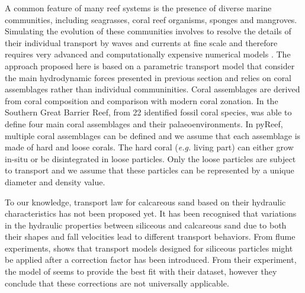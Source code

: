 \documentclass[default,jgrga]{agutex2015}
\begin{document}
\begin{article}
A common feature of many reef systems is the presence of diverse marine communities, including seagrasses, coral reef organisms, sponges and mangroves. Simulating the evolution of these communities involves to resolve the details of their individual transport by waves and currents at fine scale and therefore requires very advanced and computationally expensive numerical models \citep{Lowe16}. The approach proposed here is based on a parametric transport model that consider the main hydrodynamic forces presented in previous section and  relies on coral assemblages rather than individual communinities. Coral assemblages are derived from coral composition and comparison with modern coral zonation. In the Southern Great Barrier Reef, from 22 identified fossil coral species, \citet{Dechnik15} was able to define four main coral assemblages and their palaeoenvironments. In pyReef, multiple coral assemblages can be defined and we assume that each assemblage is made of hard and loose corals. The hard coral (\textit{e.g.} living part) can either grow in-situ or be disintegrated in loose particles. Only the loose particles are subject to transport and we assume that these particles can be represented by a unique diameter and density value.

To our knowledge, transport law for calcareous sand based on their hydraulic characteristics has not been proposed yet. It has been recognised \citep{Prager96, Day97, Smith04} that variations in the hydraulic properties between siliceous and calcareous sand due to both their shapes and fall velocities lead to different transport behaviors. From flume experiments, \citet{Smith05} shows that transport models designed for siliceous particles might be applied after a correction factor has been introduced. From their experiment, the model of \citet{Engelund67} seems to provide the best fit with their dataset, however they conclude that these corrections are not universally applicable.


\end{article}
\end{document}
